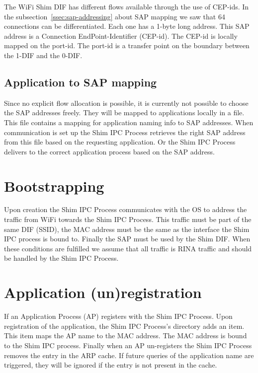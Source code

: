 The WiFi Shim DIF has different flows available through the use of CEP-ids. In the subsection~\ref{ssec:sap-addressing} about SAP mapping we saw that 64 connections can be differentiated. Each one has a 1-byte long address. This SAP address is a Connection EndPoint-Identifier (CEP-id). The CEP-id is locally mapped on the port-id. The port-id is a transfer point on the boundary between the 1-DIF and the 0-DIF. 

\subsection{Application to SAP mapping}

Since no explicit flow allocation is possible, it is currently not possible to choose the SAP addresses freely. They will be mapped to applications locally in a file. This file contains a mapping for application naming info to SAP addresses. When communication is set up the Shim IPC Process retrieves the right SAP address from this file based on the requesting application. Or the Shim IPC Process delivers to the correct application process based on the SAP address. 

\section{Bootstrapping}

Upon creation the Shim IPC Process communicates with the OS to address the traffic from WiFi towards the Shim IPC Process. This traffic must be part of the same DIF (SSID), the MAC address must be the same as the interface the Shim IPC process is bound to. Finally the SAP must be used by the Shim DIF. When these conditions are fulfilled we assume that all traffic is RINA traffic and should be handled by the Shim IPC Process.

\section{Application (un)registration}

If an Application Process (AP) registers with the Shim IPC Process. Upon registration of the application, the Shim IPC Process's directory adds an item. This item maps the AP name to the MAC address. The MAC address is bound to the Shim IPC process. Finally when an AP un-registers the Shim IPC Process removes the entry in the ARP cache. If future queries of the application name are triggered, they will be ignored if the entry is not present in the cache.

